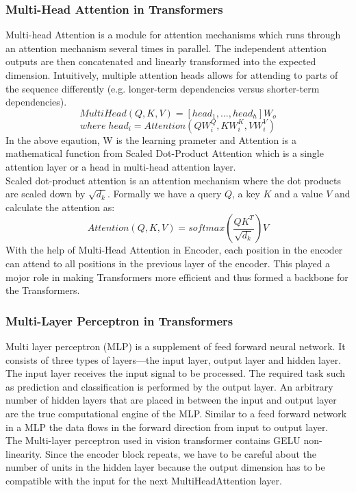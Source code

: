 \subsubsection{Multi-Head Attention in Transformers}
Multi-head Attention is a module for attention mechanisms which runs through an attention mechanism several times in parallel. The independent attention outputs are then concatenated and linearly transformed into the expected dimension. Intuitively, multiple attention heads allows for attending to parts of the sequence differently (e.g. longer-term dependencies versus shorter-term dependencies).
\[ MultiHead(Q, K, V) = [head_1,...,head_h]W_o \]
\[ where \; head_i = Attention(QW_i^Q, KW_i^K, VW_i^V) \]
In the above eqaution, W is the learning prameter and Attention is a mathematical function from Scaled Dot-Product Attention which is a single attention layer or a head in multi-head attention layer.
\\
Scaled dot-product attention is an attention mechanism where the dot products are scaled down by \(\sqrt{d_k}\). Formally we have a query \(Q\), a key \(K\) and a value \(V\) and calculate the attention as:
\[ Attention(Q,K,V) = softmax\left(\frac{QK^T}{\sqrt{d_k}}\right)V \]
With the help of Multi-Head Attention in Encoder, each position in the encoder can attend to all positions in the previous layer of the encoder. This played a mojor role in making Transformers more efficient and thus formed a backbone for the Transformers.

\subsubsection{Multi-Layer Perceptron in Transformers}
Multi layer perceptron (MLP) is a supplement of feed forward neural network. It consists of three types of layers—the input layer, output layer and hidden layer. The input layer receives the input signal to be processed. The required task such as prediction and classification is performed by the output layer. An arbitrary number of hidden layers that are placed in between the input and output layer are the true computational engine of the MLP. Similar to a feed forward network in a MLP the data flows in the forward direction from input to output layer.
\\
The Multi-layer perceptron used in vision transformer contains GELU non-linearity\cite{hendrycks2020gaussian}. Since the encoder block repeats, we have to be careful about the number of units in the hidden layer because the output dimension has to be compatible with the input for the next MultiHeadAttention layer.

